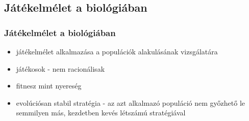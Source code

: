 \subsection{Játékelmélet a biológiában}
\begin{frame}
\frametitle{Játékelmélet a biológiában}
\begin{itemize}
	\item játékelmélet alkalmazása a populációk alakulásának vizsgálatára
	\item játékosok - nem racionálisak
	\item fitnesz mint nyereség
	\item evolúciósan stabil stratégia - az azt alkalmazó populáció nem győzhető le semmilyen más, kezdetben kevés létszámú stratégiával
\end{itemize}
\end{frame}
